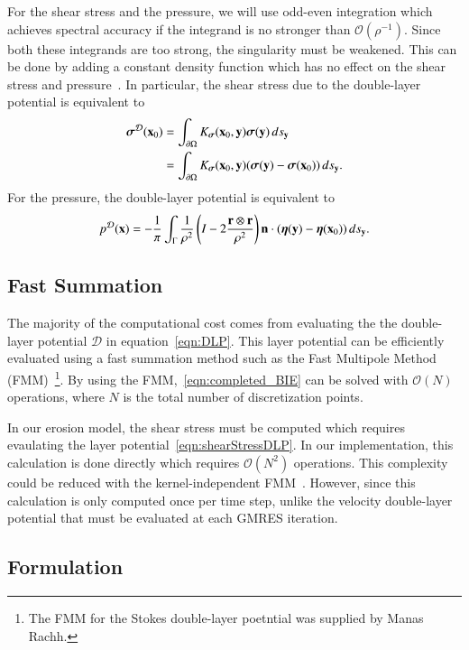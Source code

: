 \documentclass[preprint, 10pt]{elsarticle}
\begin{document}
For the shear stress and the pressure, we will use odd-even integration
which achieves spectral accuracy if the integrand is no stronger than
$\mathcal{O}(\rho^{-1})$.  Since both these integrands are too strong,
the singularity must be weakened.  This can be done by adding a constant
density function which has no effect on the shear stress and
pressure~\cite{poz1992}.  In particular, the shear stress due to the
double-layer potential is equivalent to
\begin{align*}
  {\boldsymbol\sigma}^{{\mathcal{D}}}({\mathbf{x}}_0) &= \int_{{\partial}\Omega}K_{\boldsymbol\sigma}({\mathbf{x}}_0,{\mathbf{y}})
      {\boldsymbol\sigma}({\mathbf{y}}) \, ds_{{\mathbf{y}}} \\ 
      &= \int_{{\partial}\Omega}K_{\boldsymbol\sigma}({\mathbf{x}}_0,{\mathbf{y}})
      ({\boldsymbol\sigma}({\mathbf{y}}) - {\boldsymbol\sigma}({\mathbf{x}}_0)) \, ds_{{\mathbf{y}}}.
\end{align*}
For the pressure, the double-layer potential is equivalent to
\begin{align*}
  p^{\mathcal{D}}({\mathbf{x}}) = -\frac{1}{\pi}\int_{\Gamma} \frac{1}{\rho^2}
    \left(I - 2 \frac{{\mathbf{r}} \otimes {\mathbf{r}}}{\rho^2}\right) 
    {\mathbf{n}} \cdot ({\boldsymbol\eta}({\mathbf{y}}) - {\boldsymbol\eta}({\mathbf{x}}_0)) \,ds_{\mathbf{y}}.
\end{align*}

\subsection{Fast Summation} 
The majority of the computational cost comes from evaluating the the
double-layer potential $\mathcal{D}$ in equation~\eqref{eqn:DLP}.  This
layer potential can be efficiently evaluated using a fast summation
method such as the Fast Multipole Method
(FMM)~\cite{gre-rok1987}\footnote{The FMM for the Stokes double-layer
poetntial was supplied by Manas Rachh.}.  By using the
FMM,~\eqref{eqn:completed_BIE} can be solved with $\mathcal{O}(N)$
operations, where $N$ is the total number of discretization points.

In our erosion model, the shear stress must be computed which requires
evaulating the layer potential~\eqref{eqn:shearStressDLP}.  In our
implementation, this calculation is done directly which requires
$\mathcal{O}(N^2)$ operations.  This complexity could be reduced with
the kernel-independent FMM~\cite{yin-bir-zor2004}.  However, since this
calculation is only computed once per time step, unlike the velocity
double-layer potential that must be evaluated at each GMRES iteration.  

\subsection{\thL Formulation} 
\label{sec:thetaL}
\end{document}
